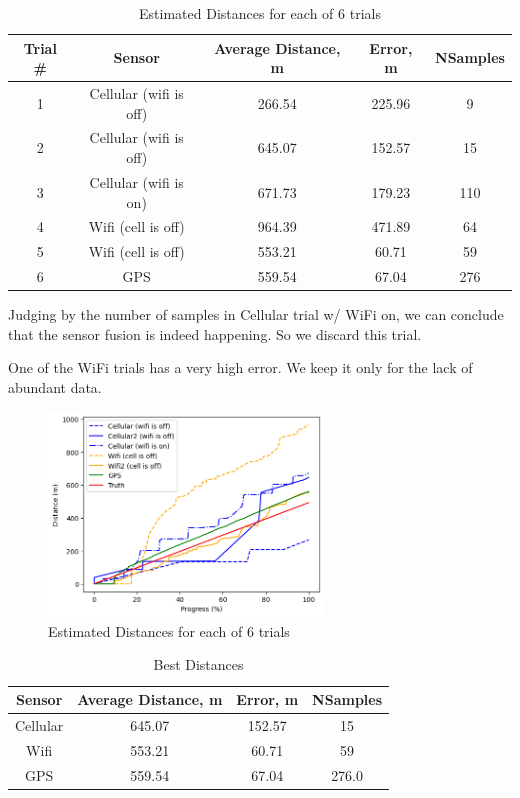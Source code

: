 \documentclass{lab}
\begin{document}
\begin{table}[h!]
    \centering
    \begin{tabular}{|c|c|c|c|c|}
        \hline
        \textbf{Trial \#} & \textbf{Sensor} & \textbf{Average Distance, m} & \textbf{Error, m} & \textbf{NSamples} \\ \hline
        1 & Cellular (wifi is off) & 266.54 & 225.96 & 9 \\ \hline
        2 & Cellular (wifi is off) & 645.07 & 152.57 & 15 \\ \hline
        3 & Cellular (wifi is on) & 671.73 & 179.23 & 110 \\ \hline
        4 & Wifi (cell is off) & 964.39 & 471.89 & 64 \\ \hline
        5 & Wifi (cell is off) & 553.21 & 60.71 & 59 \\ \hline
        6 & GPS & 559.54 & 67.04 & 276 \\ \hline
    \end{tabular}
    \caption{Estimated Distances for each of 6 trials}
    \label{tab:distances}
\end{table}

Judging by the number of samples in Cellular trial w/ WiFi on, we can conclude that the sensor fusion is indeed happening. So we discard this trial.

One of the WiFi trials has a very high error. We keep it only for the lack of abundant data.


\begin{figure}[h!]
\begin{center}
\includegraphics[width=0.65\textwidth]{images/distances.png} 
\caption{Estimated Distances for each of 6 trials}
\end{center}  
\end{figure}

\begin{table}[h!]
  \centering
  \begin{tabular}{|c|c|c|c|}
      \hline
      \textbf{Sensor} & \textbf{Average Distance, m} & \textbf{Error, m} & \textbf{NSamples} \\ \hline
        Cellular & 645.07 & 152.57 & 15 \\ \hline
        Wifi & 553.21 & 60.71 & 59 \\ \hline
        GPS & 559.54 & 67.04 & 276.0 \\ \hline
  \end{tabular}
  \caption{Best Distances}
  \label{tab:best}
\end{table}
\end{document}
